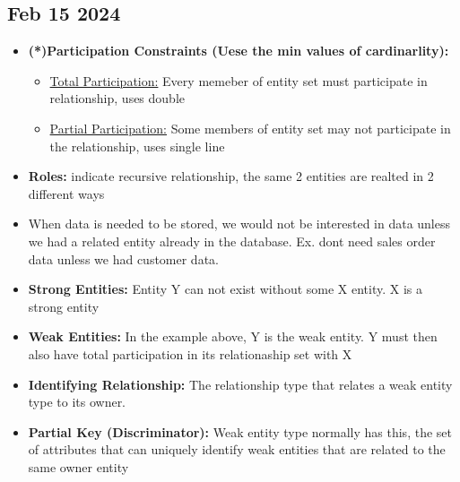 \documentclass[12pt]{article}
\begin{document}
\subsection*{Feb 15 2024}

\begin{itemize}
			\item \textbf{(*)Participation Constraints (Uese the min values of cardinarlity):}
					\begin{itemize}
							\item \underline{Total Participation:} Every memeber of entity set must participate
							in relationship, uses double
							\item \underline{Partial Participation:} Some members of entity set may not participate
							in the relationship, uses single line
					\end{itemize}
			\item \textbf{Roles:} indicate recursive relationship, the same 2 entities are realted in 
						2 different ways
			\item When data is needed to be stored, we would not be interested in data unless we had a 
			related entity already in the database. Ex. dont need sales order data unless we had 
			customer data. 
			\item \textbf{Strong Entities:} Entity Y can not exist without some X entity. X is a strong entity
			\item \textbf{Weak Entities:} In the example above, Y is the weak entity. Y must then also
			have total participation in its relationaship set with X
			\item \textbf{Identifying Relationship:} The relationship type that relates a weak entity type to its 
			owner.
			\item \textbf{Partial Key (Discriminator):} Weak entity type normally has this, 
			the set of attributes that can 
			uniquely identify weak entities that are related to the same owner entity
\end{itemize}
\end{document}

